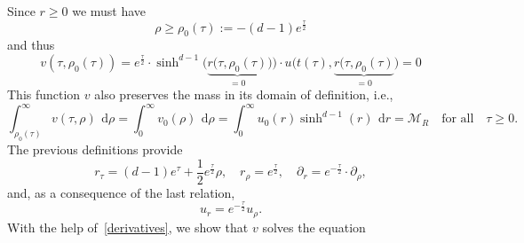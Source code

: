 \documentclass[12pt,longbibliography]{article}
\def\d{\,\mathrm{d}}
\def\d{\,\mathrm{d}}
\theoremstyle{definition}
\theoremstyle{remark}
\theoremstyle{example}
\begin{document}
Since $r\geq 0$ we must have
\[%
\rho\geq \rho_0(\tau):= -(d-1)e^\frac{\tau}{2}
\]
and thus
\[
v(\tau, \rho_0(\tau)) = e^\frac{\tau}{2}\cdot\sinh^{d-1}\big(\underbrace{r(\tau,\rho_0(\tau)}_{=0})\big)\cdot u\big(t(\tau), \underbrace{r(\tau,\rho_0(\tau)}_{=0}\big) = 0
\]
This function $v$ also preserves the mass in its domain of definition, i.e.,
\[
\int_{\rho_0(\tau)}^\infty v(\tau, \rho)\ \d \rho = \int_0^\infty v_0(\rho)\ \d \rho = \int_0^\infty u_0(r)\sinh^{d-1}(r)\ \d r = \mathcal{M}_{R}\quad\text{for all}\quad \tau\geq 0.
\]
The previous definitions provide
\begin{equation}\label{derivatives}
r_\tau = (d-1)e^\tau  + \frac{1}{2}e^\frac{\tau}{2}\rho,\quad r_\rho = e^\frac{\tau}{2}, \quad \partial_r = e^{-\frac{\tau}{2}}\cdot \partial_\rho,
\end{equation}
and, as a consequence of the last relation,
\[
u_r = e^{-\frac{\tau}{2}}u_\rho.
\]
With the help of~\eqref{derivatives}, we show that $v$ solves the equation
\end{document}
